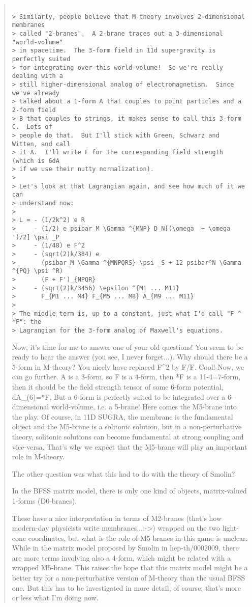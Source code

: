 \begin{quote}
\begin{verbatim}

> Similarly, people believe that M-theory involves 2-dimensional membranes
> called "2-branes".  A 2-brane traces out a 3-dimensional "world-volume"
> in spacetime.  The 3-form field in 11d supergravity is perfectly suited
> for integrating over this world-volume!  So we're really dealing with a
> still higher-dimensional analog of electromagnetism.  Since we've already
> talked about a 1-form A that couples to point particles and a 2-form field
> B that couples to strings, it makes sense to call this 3-form C.  Lots of
> people do that.  But I'll stick with Green, Schwarz and Witten, and call
> it A.  I'll write F for the corresponding field strength (which is 6dA
> if we use their nutty normalization).
>
> Let's look at that Lagrangian again, and see how much of it we can
> understand now:
>
> L = - (1/2k^2) e R
>     - (1/2) e psibar_M \Gamma ^{MNP} D_N[(\omega  + \omega ')/2] \psi _P
>     - (1/48) e F^2
>     - (sqrt(2)k/384) e
>       (psibar_M \Gamma ^{MNPQRS} \psi _S + 12 psibar^N \Gamma ^{PQ} \psi ^R)
>       (F + F')_{NPQR}
>     - (sqrt(2)k/3456) \epsilon ^{M1 ... M11}
>       F_{M1 ... M4} F_{M5 ... M8} A_{M9 ... M11}
>
> The middle term is, up to a constant, just what I'd call "F ^ *F": the
> Lagrangian for the 3-form analog of Maxwell's equations.
\end{verbatim}
    

Now, it's time for me to answer one of your old questions! You seem to be
ready to hear the answer (you see, I never forget...).
Why should there be a 5-form in M-theory?
You nicely have replaced F^2 by F/\*F. Cool! Now, we can go further.
A is a 3-form, so F is a 4-form, then *F is a 11-4=7-form, then it should be
the field strength tensor of some 6-form potential, dA_(6)=*F, But a 6-form is
perfectly suited to be integrated over a 6-dimensional world-volume, i.e. a
5-brane! Here comes the M5-brane into the play.
Of course, in 11D SUGRA, the membrane is the fundamental object and the
M5-brane is a solitonic solution, but in a non-perturbative theory, solitonic
solutions can become fundamental at strong coupling and vice-versa. That's 
why we expect that the M5-brane will play an important role in M-theory.

The other question was what this had to do with the theory of Smolin?

In the BFSS matrix model, there is only one kind of objects, matrix-valued
1-forms (D0-branes).

These have a nice interpretation in terms of M2-branes (that's how modern-day
physicists write membranes...:->) wrapped on the two light-cone coordinates,
but what is the role of M5-branes in this game is unclear.
While in the matrix model proposed by Smolin in hep-th/0002009, there are more
terms involving also a 4-form, which might be related with a wrapped M5-brane.
This raises the hope that this matrix model might be a better try for a
non-perturbative version of M-theory than the usual BFSS one. But this has to
be investigated in more detail, of course; that's more or less what I'm doing
now.



\end{quote}
